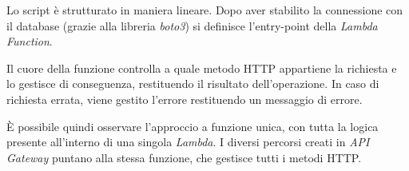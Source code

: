 Lo script è strutturato in maniera lineare. Dopo aver stabilito la connessione con il database (grazie alla libreria \textit{boto3}) si definisce l'entry-point della \textit{Lambda Function}.

Il cuore della funzione controlla a quale metodo HTTP appartiene la richiesta e lo gestisce di conseguenza, restituendo il risultato dell'operazione. In caso di richiesta errata, viene gestito l'errore restituendo un messaggio di errore.

È possibile quindi osservare l'approccio a funzione unica, con tutta la logica presente all'interno di una singola \textit{Lambda}. I diversi percorsi creati in \textit{API Gateway} puntano alla stessa funzione, che gestisce tutti i metodi HTTP.